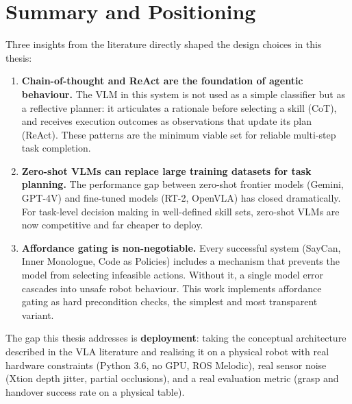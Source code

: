 \section{Summary and Positioning}
\label{sec:sota_summary}

Three insights from the literature directly shaped the design choices in this thesis:

\begin{enumerate}

  \item \textbf{Chain-of-thought and ReAct are the foundation of agentic behaviour.}
        The VLM in this system is not used as a simple classifier but as a reflective
        planner: it articulates a rationale before selecting a skill (CoT), and receives
        execution outcomes as observations that update its plan (ReAct).
        These patterns are the minimum viable set for reliable multi-step task completion.

  \item \textbf{Zero-shot VLMs can replace large training datasets for task planning.}
        The performance gap between zero-shot frontier models (Gemini, GPT-4V) and
        fine-tuned models (RT-2, OpenVLA) has closed dramatically.
        For task-level decision making in well-defined skill sets, zero-shot VLMs are
        now competitive and far cheaper to deploy.

  \item \textbf{Affordance gating is non-negotiable.}
        Every successful system (SayCan, Inner Monologue, Code as Policies) includes
        a mechanism that prevents the model from selecting infeasible actions.
        Without it, a single model error cascades into unsafe robot behaviour.
        This work implements affordance gating as hard precondition checks, the
        simplest and most transparent variant.

\end{enumerate}

The gap this thesis addresses is \textbf{deployment}: taking the conceptual
architecture described in the VLA literature and realising it on a physical robot
with real hardware constraints (Python 3.6, no GPU, ROS Melodic), real sensor noise
(Xtion depth jitter, partial occlusions), and a real evaluation metric (grasp and
handover success rate on a physical table).
